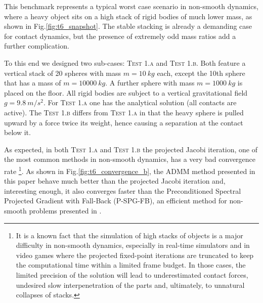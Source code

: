 \documentclass[AMA,STIX1COL]{WileyNJD-v2}
\begin{document}
This benchmark represents a typical worst case scenario in non-smooth dynamics, where
a heavy object sits on a high stack of rigid bodies of much lower mass, as shown in Fig.\ref{fig:t6_snapshot}. The stable stacking
is already a demanding case for contact dynamics, but the presence of extremely odd mass ratios add a
further complication. 

To this end we designed two sub-cases: \textsc{Test 1.a} and \textsc{Test 1.b}. Both feature
a vertical stack of 20 spheres with mass $m=\SI{10}{kg}$ each, except the 10th sphere that has
a mass of $m=\SI{10000}{kg}$. A further sphere with mass $m=\SI{1000}{kg}$ is placed on the floor.
All rigid bodies are subject to a vertical gravitational field $g=\SI{9.8}{m/s^2}$. For \textsc{Test 1.a}
one has the analytical solution (all contacts are active). The \textsc{Test 1.b}
differs from \textsc{Test 1.a} in that the heavy sphere is pulled upward by a force twice its weight, hence
causing a separation at the contact below it.

As expected, in both \textsc{Test 1.a} and \textsc{Test 1.b} the projected Jacobi iteration, one of the most common
methods in non-smooth dynamics, has a very bad convergence rate \footnote{It is a known fact that the simulation 
of high stacks of objects is a major difficulty in non-smooth dynamics, especially in real-time simulators
and in video games where the projected fixed-point iterations are truncated to keep the computational
time within a limited frame budget. In those cases, the limited precision of the solution will lead to underestimated
contact forces, undesired slow interpenetration of the parts and, ultimately, to unnatural collapses of stacks.}.
As shown in Fig.\ref{fig:t6_convergence_b}, 
the ADMM method presented in this paper behave
much better than the projected Jacobi iteration and, interesting enough, it also converges faster
than the Preconditioned Spectral Projected Gradient with Fall-Back (P-SPG-FB), an
efficient method for non-smooth problems presented in \cite{hammadTOG2015}.
\end{document}
